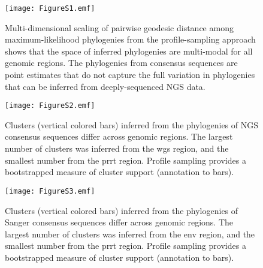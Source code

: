 \documentclass[letterpaper]{article}
\begin{document}
\begin{figure}[H]
	\caption{Multi-dimensional scaling of pairwise geodesic distance among maximum-likelihood phylogenies from the profile-sampling approach shows that the space of inferred phylogenies are multi-modal for all genomic regions. The phylogenies from consensus sequences are point estimates that do not capture the full variation in phylogenies that can be inferred from deeply-sequenced NGS data.}
	\centering
	\texttt{[image: FigureS1.emf]}
\end{figure}

\begin{figure}[H]
	\caption{Clusters (vertical colored bars) inferred from the phylogenies of NGS consensus sequences differ across genomic regions. The largest number of clusters was inferred from the wgs region, and the smallest number from the prrt region. Profile sampling provides a bootstrapped measure of cluster support (annotation to bars).}
	\centering
	\texttt{[image: FigureS2.emf]}
\end{figure}

\begin{figure}[H]
	\caption{Clusters (vertical colored bars) inferred from the phylogenies of Sanger consensus sequences differ across genomic regions. The largest number of clusters was inferred from the env region, and the smallest number from the prrt region. Profile sampling provides a bootstrapped measure of cluster support (annotation to bars).}
	\centering
	\texttt{[image: FigureS3.emf]}
\end{figure}
\end{document}
